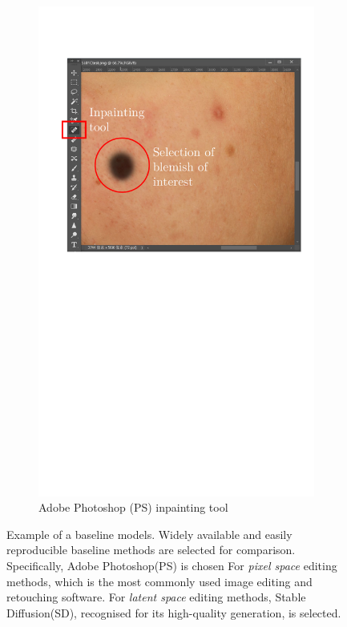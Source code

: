 \begin{spacing}{1.5}
\begin{figure}[t!]
\begin{subfigure}{.97\textwidth}
        \includegraphics[width=0.97\columnwidth]{Chapter4/ps_ui.pdf}
        \caption{Adobe Photoshop (PS) inpainting tool}
        \label{fig:ps}
    \end{subfigure}
    \caption{Example of a baseline models. Widely available and easily reproducible baseline methods are selected for comparison. Specifically, Adobe Photoshop(PS) is chosen For \textit{pixel space} editing methods, which is the most commonly used image editing and retouching software. For \textit{latent space} editing methods, Stable Diffusion(SD), recognised for its high-quality generation, is selected.}
    \label{fig:ps_sd}
\end{figure}


\end{spacing}
